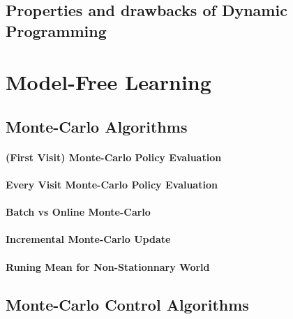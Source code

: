 	\subsection{Properties and drawbacks of Dynamic Programming} %
		\label{sub:properties_and_drawbacks_of_dynamic_programming}
	


\section{Model-Free Learning} %
	\label{sec:model_free_learning}

	\subsection{Monte-Carlo Algorithms} %
		\label{sub:monte_carlo_algorithm}

		\paragraph*{(First Visit) Monte-Carlo Policy Evaluation}

		\paragraph*{Every Visit Monte-Carlo Policy Evaluation}


		\paragraph*{Batch vs Online Monte-Carlo}

		\paragraph*{Incremental Monte-Carlo Update}

		\paragraph*{Runing Mean for Non-Stationnary World}

	\subsection{Monte-Carlo Control Algorithms} %
		\label{sub:monte_carlo_control_algorithms}
	
